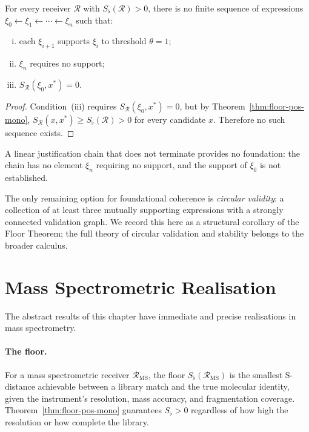 \begin{theorem}\label{thm:linear-fail-mono}
For every receiver $\mathcal{R}$ with $S_{\flat}(\mathcal{R}) > 0$, there is
no finite sequence of expressions $\xi_0 \leftarrow \xi_1 \leftarrow \cdots
\leftarrow \xi_n$ such that:
\begin{enumerate}[(i)]
  \item each $\xi_{i+1}$ supports $\xi_i$ to threshold $\theta = 1$;
  \item $\xi_n$ requires no support;
  \item $S_{\mathcal{R}}(\xi_0, x^{*}) = 0$.
\end{enumerate}
\end{theorem}

\begin{proof}
Condition~(iii) requires $S_{\mathcal{R}}(\xi_0, x^{*}) = 0$, but by
Theorem~\ref{thm:floor-pos-mono},
$S_{\mathcal{R}}(x, x^{*}) \geq S_{\flat}(\mathcal{R}) > 0$
for every candidate $x$.  Therefore no such sequence exists.
\end{proof}

\begin{corollary}
A linear justification chain that does not terminate provides no foundation:
the chain has no element $\xi_n$ requiring no support, and the support of
$\xi_0$ is not established.
\end{corollary}

The only remaining option for foundational coherence is \emph{circular
validity}: a collection of at least three mutually supporting expressions with
a strongly connected validation graph.  We record this here as a structural
corollary of the Floor Theorem; the full theory of circular validation and
stability belongs to the broader calculus.

\section{Mass Spectrometric Realisation}
\label{sec:ch14-ms}

The abstract results of this chapter have immediate and precise realisations in
mass spectrometry.

\paragraph{The floor.}
For a mass spectrometric receiver $\mathcal{R}_{\mathrm{MS}}$, the floor
$S_{\flat}(\mathcal{R}_{\mathrm{MS}})$ is the smallest S-distance achievable
between a library match and the true molecular identity, given the instrument's
resolution, mass accuracy, and fragmentation coverage.  Theorem~\ref{thm:floor-pos-mono}
guarantees $S_{\flat} > 0$ regardless of how high the resolution or how
complete the library.

